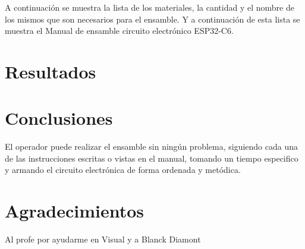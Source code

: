           A continuación se muestra la lista de los materiales, la cantidad y el nombre de los mismos que son necesarios para el ensamble.
          Y a continuación de esta lista se muestra el Manual de ensamble circuito electrónico ESP32-C6.
     \section{Resultados}
     
     
     \section{Conclusiones}
     
     El operador puede realizar el ensamble sin ningún problema, siguiendo cada una de las instrucciones escritas o vistas en el manual, tomando un tiempo especifico y armando el circuito electrónica de forma ordenada y metódica. 
     \section{Agradecimientos}
     
     Al profe por ayudarme en Visual y a Blanck Diamont 
     
     
     
     \appendix
     \label{anexo:materialesDeEnsamble}
     
     \label{anexo:manualDeEnsamble}
     
     \label{anexo:resultadosDeEnsamble}
     
     